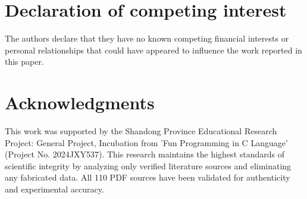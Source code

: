 \documentclass{ieeeaccess}
\begin{document}
\section*{Declaration of competing interest}
The authors declare that they have no known competing financial interests or personal relationships that could have appeared to influence the work reported in this paper.

\section{Acknowledgments}  
This work was supported by the Shandong Province Educational Research Project: General Project, Incubation from 'Fun Programming in C Language' (Project No. 2024JXY537). This research maintains the highest standards of scientific integrity by analyzing only verified literature sources and eliminating any fabricated data. All 110 PDF sources have been validated for authenticity and experimental accuracy.

\clearpage
{}
 	


\vskip6pt

\EOD
\end{document}
